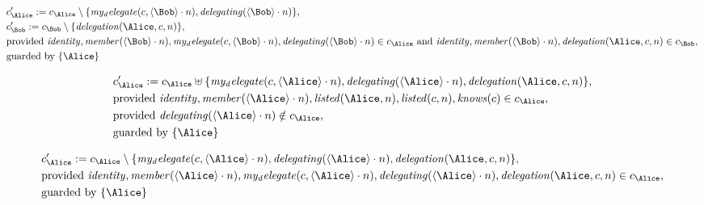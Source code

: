 \begin{align*}
&
c'_
{
\Alice
}
 := 
c_
{
\Alice
}
 \setminus 
\{
\mathit{
my_delegate
}
(
c
,
\langle
\Bob
\rangle
\cdot
n
)
,
\mathit{
delegating
}
(
\langle
\Bob
\rangle
\cdot
n
)
\}
,\\
&
c'_
{
\Bob
}
 := 
c_
{
\Bob
}
 \setminus 
\{
\mathit{
delegation
}
(
\Alice
,
c
,
n
)
\}
,\\
&
\text{provided } 
\mathit{
identity
}
,
\mathit{
member
}
(
\langle
\Bob
\rangle
\cdot
n
)
,
\mathit{
my_delegate
}
(
c
,
\langle
\Bob
\rangle
\cdot
n
)
,
\mathit{
delegating
}
(
\langle
\Bob
\rangle
\cdot
n
)
 \in c_
{
\Alice
}
 \text{ and } 
\mathit{
identity
}
,
\mathit{
member
}
(
\langle
\Bob
\rangle
\cdot
n
)
,
\mathit{
delegation
}
(
\Alice
,
c
,
n
)
 \in c_
{
\Bob
}
,\\
&
\text{guarded by } \{
\Alice
\}
\end{align*}

\begin{align*}
&
c'_
{
\Alice
}
 := 
c_
{
\Alice
}
 \uplus 
\{
\mathit{
my_delegate
}
(
c
,
\langle
\Alice
\rangle
\cdot
n
)
,
\mathit{
delegating
}
(
\langle
\Alice
\rangle
\cdot
n
)
,
\mathit{
delegation
}
(
\Alice
,
c
,
n
)
\}
,\\
&
\text{provided } 
\mathit{
identity
}
,
\mathit{
member
}
(
\langle
\Alice
\rangle
\cdot
n
)
,
\mathit{
listed
}
(
\Alice
,
n
)
,
\mathit{
listed
}
(
c
,
n
)
,
\mathit{
knows
}
(
c
)
 \in c_
{
\Alice
}
,\\
&
\text{provided } 
\mathit{
delegating
}
(
\langle
\Alice
\rangle
\cdot
n
)
 \notin c_
{
\Alice
}
,\\
&
\text{guarded by } \{
\Alice
\}
\end{align*}

\begin{align*}
&
c'_
{
\Alice
}
 := 
c_
{
\Alice
}
 \setminus 
\{
\mathit{
my_delegate
}
(
c
,
\langle
\Alice
\rangle
\cdot
n
)
,
\mathit{
delegating
}
(
\langle
\Alice
\rangle
\cdot
n
)
,
\mathit{
delegation
}
(
\Alice
,
c
,
n
)
\}
,\\
&
\text{provided } 
\mathit{
identity
}
,
\mathit{
member
}
(
\langle
\Alice
\rangle
\cdot
n
)
,
\mathit{
my_delegate
}
(
c
,
\langle
\Alice
\rangle
\cdot
n
)
,
\mathit{
delegating
}
(
\langle
\Alice
\rangle
\cdot
n
)
,
\mathit{
delegation
}
(
\Alice
,
c
,
n
)
 \in c_
{
\Alice
}
,\\
&
\text{guarded by } \{
\Alice
\}
\end{align*}

